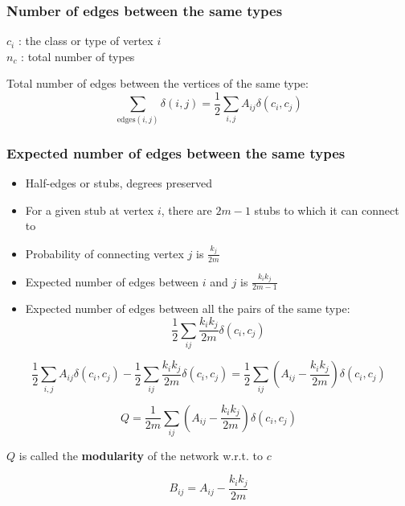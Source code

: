 \documentclass{beamer}
\begin{document}
\begin{frame}
    \frametitle{Number of edges between the same types}
        \begin{center}
        $c_i$ : the class or type of vertex $i$\\
        \vspace{2em}
        $n_c$ : total number of types
        \vspace{2em}

        Total number of edges between the vertices of the same type:
        $$\sum\limits_{\text{edges}(i,j)}\delta(i,j)=\frac{1}{2}\sum\limits_{i,j}A_{ij}\delta(c_i,c_j)$$ 
        \end{center}
\end{frame}
\begin{frame}
    \frametitle{Expected number of edges between the same types}
    \begin{itemize}
    \setlength\itemsep{1em}
        \item{Half-edges or stubs, degrees preserved}
        \item{For a given stub at vertex $i$, there are $2m-1$ stubs to which it can connect to}
        \item{Probability of connecting vertex $j$ is $\frac{k_j}{2m}$}
        \item{Expected number of edges between $i$ and $j$ is $\frac{k_ik_j}{2m-1}$}
        \item{Expected number of edges between all the pairs of the same type:
            $$\frac{1}{2}\sum\limits_{ij}\frac{k_ik_j}{2m}\delta(c_i,c_j)$$
}
    \end{itemize}
\end{frame}
\begin{frame}
        $$\frac{1}{2}\sum\limits_{i,j}A_{ij}\delta(c_i,c_j)-\frac{1}{2}\sum\limits_{ij}\frac{k_ik_j}{2m}\delta(c_i,c_j)=\frac{1}{2}\sum\limits_{ij}\left(A_{ij}-\frac{k_ik_j}{2m}\right)\delta(c_i,c_j)$$ 

        \vspace{2em}
        \pause
        $$Q = \frac{1}{2m}\sum\limits_{ij}\left(A_{ij}-\frac{k_ik_j}{2m}\right)\delta(c_i,c_j)$$

        \vspace{2em}
        \centering
        $Q$ is called the {\bf modularity} of the network w.r.t. to $c$

        $$B_{ij}=A_{ij}-\frac{k_ik_j}{2m}$$
\end{frame}
\end{document}
